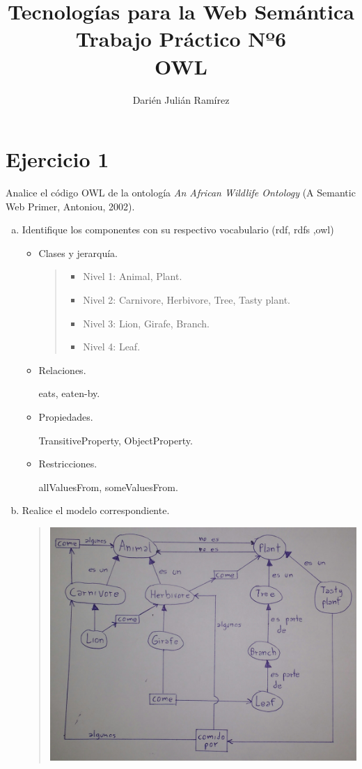 \documentclass[a4paper,12pt,twoside,final,spanish]{article}
\title{\Huge Tecnologías para la Web Semántica\\
Trabajo Práctico Nº6\\
OWL}
\author{Darién Julián Ramírez}
\date{\vspace{-5ex}}
\begin{document}
\maketitle %

\section*{Ejercicio 1}

Analice el código OWL de la ontología \textit{An African Wildlife Ontology} (A 
Semantic Web Primer, Antoniou, 2002).

\begin{enumerate}[a.]
\item Identifique los componentes con su respectivo vocabulario (rdf, rdfs ,owl)
	\begin{itemize}
	\item Clases y jerarquía.
	\begin{quote}
	\begin{itemize}
		\item Nivel 1: Animal, Plant.
		\item Nivel 2: Carnivore, Herbivore, Tree, Tasty plant.
		\item Nivel 3: Lion, Girafe, Branch.
		\item Nivel 4: Leaf.
	\end{itemize}
	\end{quote}
	\item Relaciones.
	
	eats, eaten-by.
	
	\item Propiedades.
	
	TransitiveProperty, ObjectProperty.
	
	\item Restricciones.
	
	allValuesFrom, someValuesFrom.
	
	\end{itemize}
	
\item Realice el modelo correspondiente.

\begin{quote}
\begin{center}
\includegraphics[width=0.9\linewidth,keepaspectratio]{1.jpg}
\end{center}
\end{quote}
	

\end{enumerate}
\end{document}
